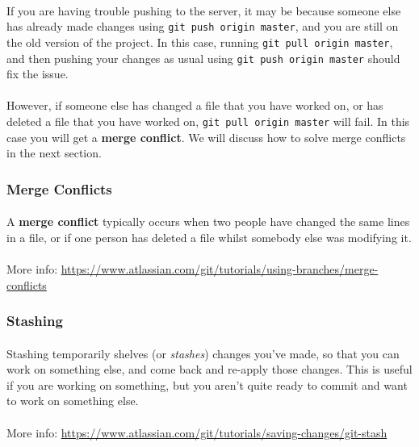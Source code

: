 \documentclass[11pt]{article}
\begin{document}
\paragraph{}
If you are having trouble pushing to the server, it may be because someone else has already made changes using \lstinline{git push origin master}, and you are still on the old version of the project. In this case, running \lstinline{git pull origin master}, and then pushing your changes as usual using \lstinline{git push origin master} should fix the issue.
\paragraph{}
However, if someone else has changed a file that you have worked on, or has deleted a file that you have worked on, \lstinline{git pull origin master} will fail. In this case you will get a \textbf{merge conflict}. We will discuss how to solve merge conflicts in the next section.
\subsubsection{Merge Conflicts}
\paragraph{}
A \textbf{merge conflict} typically occurs when two people have changed the same lines in a file, or if one person has deleted a file whilst somebody else was modifying it.
\paragraph{}
More info: \url{https://www.atlassian.com/git/tutorials/using-branches/merge-conflicts}
\subsubsection{Stashing}
\paragraph{}
Stashing temporarily shelves (or \textit{stashes}) changes you've made, so that you can work on something else, and come back and re-apply those changes. This is useful if you are working on something, but you aren't quite ready to commit and want to work on something else.
\paragraph{}
More info: \url{https://www.atlassian.com/git/tutorials/saving-changes/git-stash}
\end{document}
